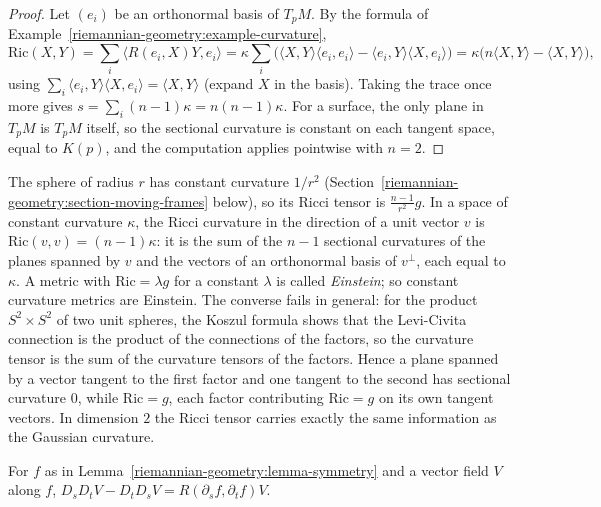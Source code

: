 \begin{proof}
Let $(e_i)$ be an orthonormal basis of $T_pM$. By the formula of Example~\ref{riemannian-geometry:example-curvature},
\[
\mathrm{Ric}(X, Y) = \sum_i\langle R(e_i, X)Y, e_i\rangle = \kappa\sum_i\bigl(\langle X, Y\rangle\langle e_i, e_i\rangle - \langle e_i, Y\rangle\langle X, e_i\rangle\bigr) = \kappa\bigl(n\langle X, Y\rangle - \langle X, Y\rangle\bigr),
\]
using $\sum_i\langle e_i, Y\rangle\langle X, e_i\rangle = \langle X, Y\rangle$ (expand $X$ in the basis). Taking the trace once more gives $s = \sum_i(n - 1)\kappa = n(n - 1)\kappa$. For a surface, the
only plane in $T_pM$ is $T_pM$ itself, so the sectional curvature is constant on each tangent space, equal to $K(p)$, and the computation applies pointwise with $n = 2$.
\end{proof}

\begin{remark}\label{riemannian-geometry:remark-einstein}
The sphere of radius $r$ has constant curvature $1/r^2$ (Section~\ref{riemannian-geometry:section-moving-frames} below), so its Ricci tensor is $\frac{n-1}{r^2}g$. In a space of
constant curvature $\kappa$, the Ricci curvature in the direction of a unit vector $v$ is $\mathrm{Ric}(v, v) = (n - 1)\kappa$: it is the sum of the $n - 1$ sectional curvatures of the planes
spanned by $v$ and the vectors of an orthonormal basis of $v^\perp$, each equal to $\kappa$. A metric with $\mathrm{Ric} = \lambda g$ for a constant $\lambda$ is called \emph{Einstein}; so
constant curvature metrics are Einstein. The converse fails in general: for the product $S^2 \times S^2$ of two unit spheres, the Koszul formula shows that the Levi-Civita connection is the
product of the connections of the factors, so the curvature tensor is the sum of the curvature tensors of the factors. Hence a plane spanned by a vector tangent to the first factor and
one tangent to the second has sectional curvature $0$, while $\mathrm{Ric} = g$, each factor contributing $\mathrm{Ric} = g$ on its own tangent vectors. In dimension $2$ the Ricci tensor
carries exactly the same information as the Gaussian curvature.
\end{remark}

\begin{lemma}\label{riemannian-geometry:lemma-curvature-families}
For $f$ as in Lemma~\ref{riemannian-geometry:lemma-symmetry} and a vector field $V$ along $f$, $D_sD_tV - D_tD_sV = R(\partial_sf, \partial_tf)V$.
\end{lemma}


